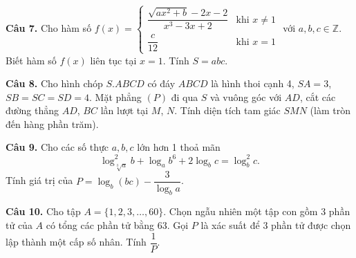 \documentclass[11pt,a4paper]{article}
\newcommand{\Cau}[1]{\textbf{Câu #1.}}
\begin{document}
\Cau{7} Cho hàm số $f(x)=\begin{cases}\dfrac{\sqrt{ax^2+b}-2x-2}{x^3-3x+2} & \text{khi } x\neq1\\[8pt] \dfrac{c}{12} & \text{khi } x=1\end{cases}$ với $a,b,c\in\mathbb Z$. Biết hàm số $f(x)$ liên tục tại $x=1$. Tính $S=abc$.

\Cau{8} Cho hình chóp $S.ABCD$ có đáy $ABCD$ là hình thoi cạnh 4, $SA=3$, $SB=SC=SD=4$. Mặt phẳng $(P)$ đi qua $S$ và vuông góc với $AD$, cắt các đường thẳng $AD$, $BC$ lần lượt tại $M$, $N$. Tính diện tích tam giác $SMN$ (làm tròn đến hàng phần trăm).

\Cau{9} Cho các số thực $a,b,c$ lớn hơn 1 thoả mãn
\[\log^2_{\sqrt[3]{a}}b+\log_ab^6+2\log_bc=\log_b^2c.\]
Tính giá trị của $P=\log_b(bc)-\dfrac{3}{\log_ba}$.

\Cau{10} Cho tập $A=\{1,2,3,\dots,60\}$. Chọn ngẫu nhiên một tập con gồm 3 phần tử của $A$ có tổng các phần tử bằng 63. Gọi $P$ là xác suất để 3 phần tử được chọn lập thành một cấp số nhân. Tính $\dfrac1P$.
\end{document}
